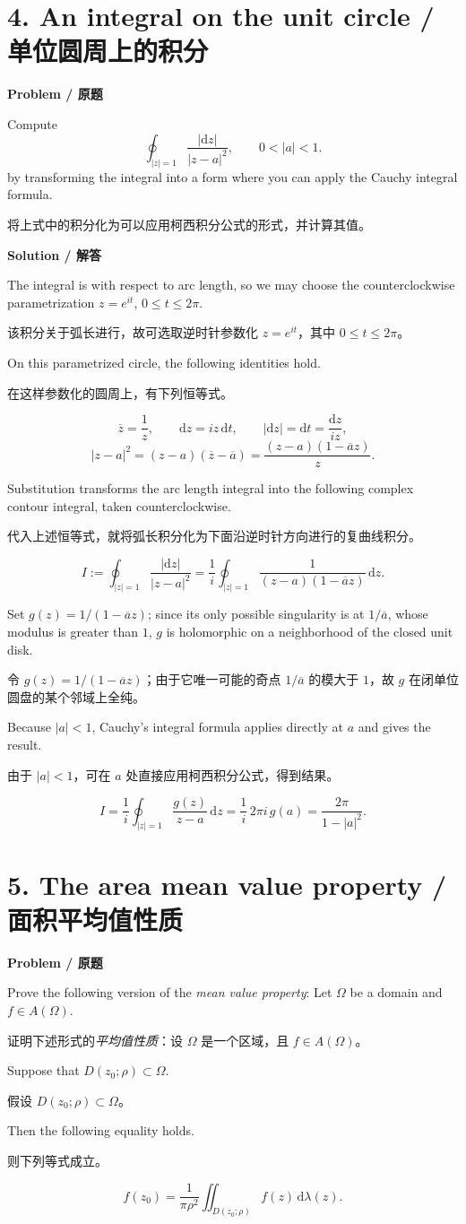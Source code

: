 \documentclass[11pt,a4paper]{ctexart}
\newcommand{\pair}[2]{\par\noindent #1\par\nopagebreak[3]\noindent #2\par}
\newcommand{\heading}[2]{\par\medskip\textbf{#1 / #2}\par\nopagebreak[4]}
\newcommand{\dd}{\,\mathrm d}
\begin{document}
\newpage
\section*{4. An integral on the unit circle / 单位圆周上的积分}
\heading{Problem}{原题}
Compute
\[
\oint_{|z|=1}\frac{|\mathrm dz|}{|z-a|^2},\qquad 0<|a|<1.
\]
by transforming the integral into a form where you can apply the Cauchy integral formula.
\par\nopagebreak[3]
将上式中的积分化为可以应用柯西积分公式的形式，并计算其值。

\heading{Solution}{解答}
\pair{The integral is with respect to arc length, so we may choose the counterclockwise parametrization $z=e^{it}$, $0\le t\le2\pi$.}{该积分关于弧长进行，故可选取逆时针参数化 $z=e^{it}$，其中 $0\le t\le2\pi$。}
\pair{On this parametrized circle, the following identities hold.}{在这样参数化的圆周上，有下列恒等式。}
\[
\overline z=\frac1z,\qquad \mathrm dz=iz\dd t,
\qquad |\mathrm dz|=\mathrm dt=\frac{\mathrm dz}{iz},
\]
\[
|z-a|^2=(z-a)(\overline z-\overline a)
=\frac{(z-a)(1-\overline a z)}{z}.
\]
\pair{Substitution transforms the arc length integral into the following complex contour integral, taken counterclockwise.}{代入上述恒等式，就将弧长积分化为下面沿逆时针方向进行的复曲线积分。}
\[
I:=\oint_{|z|=1}\frac{|\mathrm dz|}{|z-a|^2}
=\frac1i\oint_{|z|=1}\frac{1}{(z-a)(1-\overline a z)}\dd z.
\]
\pair{Set $g(z)=1/(1-\overline a z)$; since its only possible singularity is at $1/\overline a$, whose modulus is greater than $1$, $g$ is holomorphic on a neighborhood of the closed unit disk.}{令 $g(z)=1/(1-\overline a z)$；由于它唯一可能的奇点 $1/\overline a$ 的模大于 $1$，故 $g$ 在闭单位圆盘的某个邻域上全纯。}
\pair{Because $|a|<1$, Cauchy's integral formula applies directly at $a$ and gives the result.}{由于 $|a|<1$，可在 $a$ 处直接应用柯西积分公式，得到结果。}
\[
I=\frac1i\oint_{|z|=1}\frac{g(z)}{z-a}\dd z
=\frac1i\,2\pi i\,g(a)
=\boxed{\frac{2\pi}{1-|a|^2}}.
\]

\newpage
\section*{5. The area mean value property / 面积平均值性质}
\heading{Problem}{原题}
\pair{Prove the following version of the \emph{mean value property}: Let $\Omega$ be a domain and $f\in A(\Omega)$.}{证明下述形式的\emph{平均值性质}：设 $\Omega$ 是一个区域，且 $f\in A(\Omega)$。}
\pair{Suppose that $D(z_0;\rho)\subset\Omega$.}{假设 $D(z_0;\rho)\subset\Omega$。}
\pair{Then the following equality holds.}{则下列等式成立。}
\[
f(z_0)=\frac{1}{\pi\rho^2}\iint_{D(z_0;\rho)}f(z)\dd\lambda(z).
\]
\end{document}
